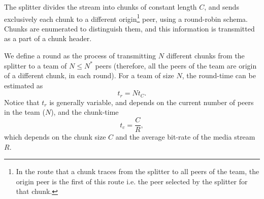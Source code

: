 

\label{sec:feeding_the_team}

The splitter divides the stream into chunks of constant length $C$,
and sends exclusively each chunk to a different
\gls{origin}\footnote{In the route that a chunk traces from the
  splitter to all peers of the team, the origin peer is the first of
  this route i.e. the peer selected by the splitter for that chunk.}
peer, using a round-robin schema. Chunks are enumerated to distinguish
them, and this information is transmitted as a part of a chunk header.

\begin{comment}
More details about the implementation
are available in Fig.~\ref{fig:chunk_generation}.


\begin{figure*}
  \fig{500}{5cm}{DBS_splitter_feed} \caption{Chunk
    generation at the splitter and their transmission to the
    team.\label{fig:chunk_generation}}
\end{figure*}
\end{comment}

We define a \gls{round} as the process of transmitting $N$ different
chunks from the splitter to a team of $N\leq N^*$ peers (therefore,
all the peers of the team are origin of a different chunk, in each
round). For a team of size $N$, the round-time can be estimated as
\begin{equation}
  t_r=Nt_C.
\end{equation}
Notice that $t_r$ is generally variable, and depends on
the current number of peers in the team ($N$), and the
\gls{chunk-time}
\begin{equation}
  \label{eq:chunk_time}
  t_c=\frac{C}{R},
\end{equation}
which depends on the chunk size $C$ and the average bit-rate of the
media stream $R$.

\begin{comment}
(in a team) as the time necessary to send two consecutive chunks from
  the splitter (of such team) to the same peer, using the
  round-robing. This time is variable and depends on $|T|$, $C$, and
  the average bit-rate of the media, $A$.
\end{comment}

